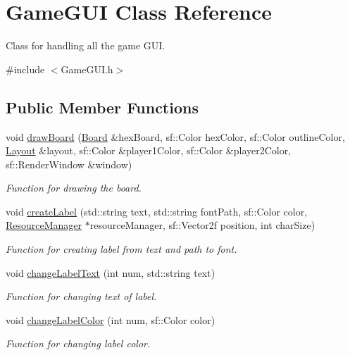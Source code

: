 \hypertarget{classGameGUI}{}\section{Game\+G\+UI Class Reference}
\label{classGameGUI}


Class for handling all the game G\+UI.  




{\ttfamily \#include $<$Game\+G\+U\+I.\+h$>$}

\subsection*{Public Member Functions}
\begin{DoxyCompactItemize}
\item 
void \hyperlink{classGameGUI_aa2df4e73b49a4cd5655e0e6c18275664}{draw\+Board} (\hyperlink{classBoard}{Board} \&hex\+Board, sf\+::\+Color hex\+Color, sf\+::\+Color outline\+Color, \hyperlink{structLayout}{Layout} \&layout, sf\+::\+Color \&player1\+Color, sf\+::\+Color \&player2\+Color, sf\+::\+Render\+Window \&window)
\begin{DoxyCompactList}\small\item\em Function for drawing the board. \end{DoxyCompactList}\item 
void \hyperlink{classGameGUI_a45f4e19738741b51cc0558767e16360c}{create\+Label} (std\+::string text, std\+::string font\+Path, sf\+::\+Color color, \hyperlink{classResourceManager}{Resource\+Manager} $\ast$resource\+Manager, sf\+::\+Vector2f position, int char\+Size)
\begin{DoxyCompactList}\small\item\em Function for creating label from text and path to font. \end{DoxyCompactList}\item 
void \hyperlink{classGameGUI_a0e479f6c675e7f65549c76364c29af0a}{change\+Label\+Text} (int num, std\+::string text)
\begin{DoxyCompactList}\small\item\em Function for changing text of label. \end{DoxyCompactList}\item 
void \hyperlink{classGameGUI_a561bdff163226813e95f84c9b4720dd0}{change\+Label\+Color} (int num, sf\+::\+Color color)
\begin{DoxyCompactList}\small\item\em Function for changing label color. \end{DoxyCompactList}\item 

\end{DoxyCompactItemize}
